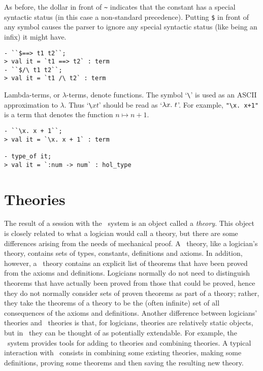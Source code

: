     As before, the dollar in front of {\small\verb|~|} indicates that
    the constant has a special syntactic status (in this case a
    non-standard precedence). Putting {\small\verb|$|} in front of any
    symbol causes the parser to ignore any special syntactic status
    (like being an infix) it might have.

\begin{session}\begin{verbatim}
- ``$==> t1 t2``;
> val it = `t1 ==> t2` : term
- ``$/\ t1 t2``;
> val it = `t1 /\ t2` : term
\end{verbatim}\end{session}

    Lambda-terms, or $\lambda$-terms, denote functions. The symbol
    `{\small\verb|\|}' is used as an {\small ASCII} approximation to
    $\lambda$.  Thus `{\small\verb|\|}$x$$t$' should be read as
    `$\lambda x.\ t$'. For example, {\small\verb|"\x. x+1"|} is a term
    that denotes the function $n\mapsto n{+}1$.

\begin{session}\begin{verbatim}
- ``\x. x + 1``;
> val it = `\x. x + 1` : term

- type_of it;
> val it = `:num -> num` : hol_type
\end{verbatim}\end{session}

\section{Theories}
\label{theories}

The result of a session with the \HOL\ system is an object called a
{\it theory\/}.  This object is closely related to what a logician
would call a theory, but there are some differences arising from the
needs of mechanical proof.  A \HOL\ theory, like a logician's theory,
contains sets of types, constants, definitions and axioms.  In
addition, however, a \HOL\ theory contains an explicit list of
theorems that have been proved from the axioms and definitions.
Logicians normally do not need to distinguish theorems that have
actually been proved from those that could be proved, hence they do
not normally consider sets of proven theorems as part of a theory;
rather, they take the theorems of a theory to be the (often infinite)
set of all consequences of the axioms and definitions.  Another
difference between logicians' theories and \HOL\ theories is that, for
logicians, theories are relatively static objects, but in \HOL\ they
can be thought of as potentially extendable. For example, the \HOL\
system provides tools for adding to theories and combining theories.
A typical interaction with \HOL\ consists in combining some existing
theories, making some definitions, proving some theorems and then
saving the resulting new theory.

